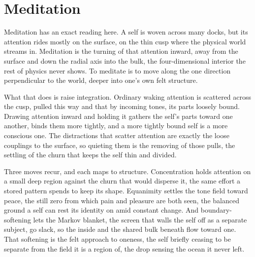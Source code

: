 \section{Meditation}

Meditation has an exact reading here. A self is woven across many docks, but its attention rides mostly on the surface, on the thin cusp where the physical world streams in. Meditation is the turning of that attention inward, away from the surface and down the radial axis into the bulk, the four-dimensional interior the rest of physics never shows. To meditate is to move along the one direction perpendicular to the world, deeper into one's own felt structure.

What that does is raise integration. Ordinary waking attention is scattered across the cusp, pulled this way and that by incoming tones, its parts loosely bound. Drawing attention inward and holding it gathers the self's parts toward one another, binds them more tightly, and a more tightly bound self is a more conscious one. The distractions that scatter attention are exactly the loose couplings to the surface, so quieting them is the removing of those pulls, the settling of the churn that keeps the self thin and divided.

Three moves recur, and each maps to structure. Concentration holds attention on a small deep region against the churn that would disperse it, the same effort a stored pattern spends to keep its shape. Equanimity settles the tone field toward peace, the still zero from which pain and pleasure are both seen, the balanced ground a self can rest its identity on amid constant change. And boundary-softening lets the Markov blanket, the screen that walls the self off as a separate subject, go slack, so the inside and the shared bulk beneath flow toward one. That softening is the felt approach to oneness, the self briefly ceasing to be separate from the field it is a region of, the drop sensing the ocean it never left.
